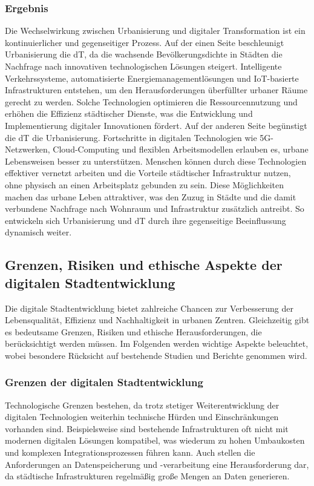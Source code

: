 \documentclass[conference,compsoc,final,a4paper, onecolumn, 11pt]{IEEEtran}
\begin{document}
\subsubsection{Ergebnis}
Die Wechselwirkung zwischen Urbanisierung und digitaler Transformation ist ein kontinuierlicher und gegenseitiger Prozess.
Auf der einen Seite beschleunigt Urbanisierung die \ac{dT}, da die wachsende Bevölkerungsdichte in Städten die Nachfrage nach innovativen technologischen Lösungen steigert. 
Intelligente Verkehrssysteme, automatisierte Energiemanagementlösungen und \ac{IoT}-basierte Infrastrukturen entstehen, um den Herausforderungen überfüllter urbaner Räume gerecht zu werden. 
Solche Technologien optimieren die Ressourcennutzung und erhöhen die Effizienz städtischer Dienste, was die Entwicklung und Implementierung digitaler Innovationen fördert.
Auf der anderen Seite begünstigt die \ac{dT} die Urbanisierung. 
Fortschritte in digitalen Technologien wie 5G-Netzwerken, Cloud-Computing und flexiblen Arbeitsmodellen erlauben es, urbane Lebensweisen besser zu unterstützen. 
Menschen können durch diese Technologien effektiver vernetzt arbeiten und die Vorteile städtischer Infrastruktur nutzen, ohne physisch an einen Arbeitsplatz gebunden zu sein. 
Diese Möglichkeiten machen das urbane Leben attraktiver, was den Zuzug in Städte und die damit verbundene Nachfrage nach Wohnraum und Infrastruktur zusätzlich antreibt.
So entwickeln sich Urbanisierung und \ac{dT} durch ihre gegenseitige Beeinflussung dynamisch weiter. 


\subsection{Grenzen, Risiken und ethische Aspekte der digitalen Stadtentwicklung}
Die digitale Stadtentwicklung bietet zahlreiche Chancen zur Verbesserung der Lebensqualität, Effizienz und Nachhaltigkeit in urbanen Zentren. 
Gleichzeitig gibt es bedeutsame Grenzen, Risiken und ethische Herausforderungen, die berücksichtigt werden müssen. 
Im Folgenden werden wichtige Aspekte beleuchtet, wobei besondere Rücksicht auf bestehende Studien und Berichte genommen wird.

\subsubsection{Grenzen der digitalen Stadtentwicklung}
Technologische Grenzen bestehen, da trotz stetiger Weiterentwicklung der digitalen Technologien weiterhin technische Hürden und Einschränkungen vorhanden sind. 
Beispielsweise sind bestehende Infrastrukturen oft nicht mit modernen digitalen Lösungen kompatibel, was wiederum zu hohen Umbaukosten und komplexen Integrationsprozessen führen kann. \autocite{kitchin_ethics_2016} 
Auch stellen die Anforderungen an Datenspeicherung und -verarbeitung eine Herausforderung dar, da städtische Infrastrukturen regelmäßig große Mengen an Daten generieren.
\end{document}
